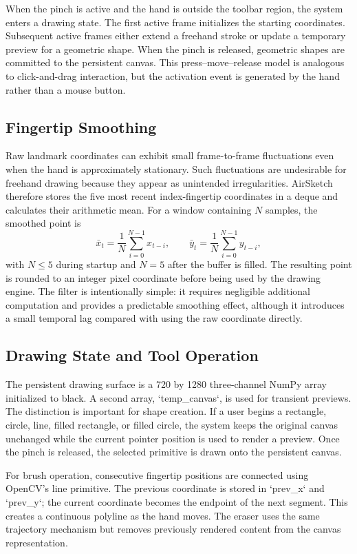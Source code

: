 \documentclass[conference]{IEEEtran}
\begin{document}
When the pinch is active and the hand is outside the toolbar region, the system enters a drawing state. The first active frame initializes the starting coordinates. Subsequent active frames either extend a freehand stroke or update a temporary preview for a geometric shape. When the pinch is released, geometric shapes are committed to the persistent canvas. This press--move--release model is analogous to click-and-drag interaction, but the activation event is generated by the hand rather than a mouse button.

\subsection{Fingertip Smoothing}
Raw landmark coordinates can exhibit small frame-to-frame fluctuations even when the hand is approximately stationary. Such fluctuations are undesirable for freehand drawing because they appear as unintended irregularities. AirSketch therefore stores the five most recent index-fingertip coordinates in a deque and calculates their arithmetic mean. For a window containing $N$ samples, the smoothed point is
\begin{equation}
 \bar{x}_t = \frac{1}{N}\sum_{i=0}^{N-1}x_{t-i}, \qquad
 \bar{y}_t = \frac{1}{N}\sum_{i=0}^{N-1}y_{t-i},
\end{equation}
with $N\leq5$ during startup and $N=5$ after the buffer is filled. The resulting point is rounded to an integer pixel coordinate before being used by the drawing engine. The filter is intentionally simple: it requires negligible additional computation and provides a predictable smoothing effect, although it introduces a small temporal lag compared with using the raw coordinate directly.

\subsection{Drawing State and Tool Operation}
The persistent drawing surface is a 720 by 1280 three-channel NumPy array initialized to black. A second array, `temp\_canvas`, is used for transient previews. The distinction is important for shape creation. If a user begins a rectangle, circle, line, filled rectangle, or filled circle, the system keeps the original canvas unchanged while the current pointer position is used to render a preview. Once the pinch is released, the selected primitive is drawn onto the persistent canvas.

For brush operation, consecutive fingertip positions are connected using OpenCV's line primitive. The previous coordinate is stored in `prev\_x` and `prev\_y`; the current coordinate becomes the endpoint of the next segment. This creates a continuous polyline as the hand moves. The eraser uses the same trajectory mechanism but removes previously rendered content from the canvas representation.
\end{document}
